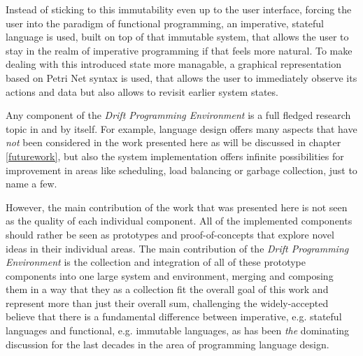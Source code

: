 Instead of sticking to this immutability even up to the user interface,
forcing the user into the paradigm of functional programming, an
imperative, stateful language is used, built on top of that immutable
system, that allows the user to stay in the realm of imperative
programming if that feels more natural. To make dealing with this
introduced state more managable, a graphical representation based
on Petri Net syntax is used, that allows the user to immediately
observe its actions and data but also allows to revisit earlier
system states.
\newline

Any component of the \textit{Drift Programming Environment} is
a full fledged research topic in and by itself. For example,
language design offers many aspects that have \textit{not} been considered
in the work presented here as will be discussed in chapter \ref{futurework},
but also the system implementation offers infinite possibilities
for improvement in areas like scheduling, load balancing or
garbage collection, just to name a few.
\newline

However, the main contribution of the work that was presented here
is not seen as the quality of each individual component. All of
the implemented components should rather be seen as prototypes and
proof-of-concepts that explore novel ideas in their individual
areas. The main contribution of the \textit{Drift Programming Environment}
is the collection and integration of all of these prototype
components into one large system and environment, merging
and composing them in a way that they as a collection fit
the overall goal of this work and represent more than just
their overall sum, challenging the widely-accepted believe
that there is a fundamental difference between imperative,
e.g. stateful languages and functional, e.g. immutable languages,
as has been \textit{the} dominating discussion for the last
decades in the area of programming language design.

